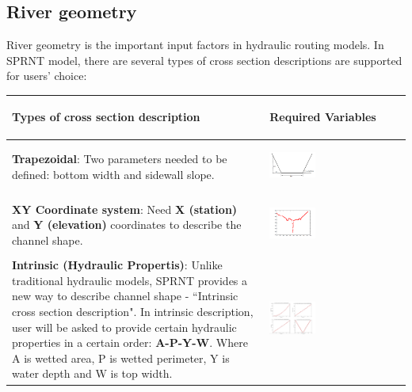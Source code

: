 \documentclass[12pt, letterpaper]{article}
\begin{document}
\begin{flushleft}
\subsection{River geometry}
River geometry is the important input factors in hydraulic routing models. In SPRNT model, there are several types of cross section descriptions are supported for users' choice:

\end{flushleft} %



\begin{table}[ht]
\centering
\begin{tabular}{*{2}{m{}}}
\hline
\begin{center} Types of cross section description\end{center} & \begin{center}Required Variables \end{center} \\
\hline
\textbf{Trapezoidal}: Two parameters needed to be defined: bottom width and sidewall slope.&\begin{center}\includegraphics[width = 0.35\textwidth]{figure/Trap.png} \end{center}\\
\hline
\textbf{XY Coordinate system}: Need \textbf{X (station)} and \textbf{Y (elevation)} coordinates to describe the channel shape.& \begin{center}\includegraphics[width = 0.35\textwidth]{figure/XY.png} \end{center}\\
\hline
\textbf{Intrinsic (Hydraulic Propertis)}: Unlike traditional hydraulic models, SPRNT provides a new way to describe channel shape - ``Intrinsic cross section description". In intrinsic description, user will be asked to provide certain hydraulic properties in a certain order: \textbf{A-P-Y-W}. Where A is wetted area, P is wetted perimeter, Y is water depth and W is top width. & \begin{center}\includegraphics[width = 0.35\textwidth]{figure/HP.png} \end{center}\\

\end{tabular}
\end{table}
\end{document}
